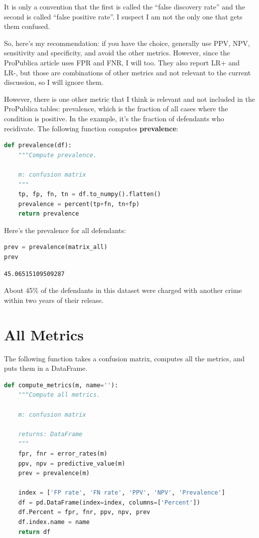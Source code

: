 It is only a convention that the first is called the ``false discovery
rate'' and the second is called ``false positive rate''. I suspect I am
not the only one that gets them confused.

So, here's my recommendation: if you have the choice, generally use PPV,
NPV, sensitivity and specificity, and avoid the other metrics. However,
since the ProPublica article uses FPR and FNR, I will too. They also
report LR+ and LR-, but those are combinations of other metrics and not
relevant to the current discussion, so I will ignore them.

However, there is one other metric that I think is relevant and not
included in the ProPublica tables: prevalence, which is the fraction of
all cases where the condition is positive. In the example, it's the
fraction of defendants who recidivate. The following function computes
\textbf{prevalence}:

\begin{lstlisting}[language=Python]
def prevalence(df):
    """Compute prevalence.
    
    m: confusion matrix
    """
    tp, fp, fn, tn = df.to_numpy().flatten()
    prevalence = percent(tp+fn, tn+fp)
    return prevalence
\end{lstlisting}

Here's the prevalence for all defendants:

\begin{lstlisting}[language=Python]
prev = prevalence(matrix_all)
prev
\end{lstlisting}

\begin{lstlisting}[]
45.06515109509287
\end{lstlisting}

About 45\% of the defendants in this dataset were charged with another
crime within two years of their release.

\hypertarget{all-metrics}{%
\section{All Metrics}\label{all-metrics}}

The following function takes a confusion matrix, computes all the
metrics, and puts them in a DataFrame.

\begin{lstlisting}[language=Python]
def compute_metrics(m, name=''):
    """Compute all metrics.
    
    m: confusion matrix
    
    returns: DataFrame
    """
    fpr, fnr = error_rates(m)
    ppv, npv = predictive_value(m)
    prev = prevalence(m)
    
    index = ['FP rate', 'FN rate', 'PPV', 'NPV', 'Prevalence']
    df = pd.DataFrame(index=index, columns=['Percent'])
    df.Percent = fpr, fnr, ppv, npv, prev
    df.index.name = name
    return df
\end{lstlisting}

